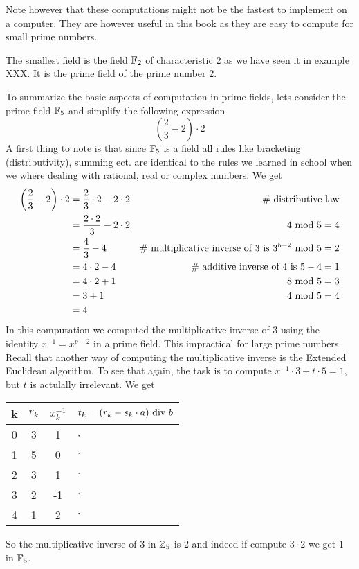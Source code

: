 Note however that these computations might not be the fastest to implement on a computer. They are however useful in this book as they are easy to compute for small prime numbers.
\begin{example}
The smallest field is the field $\mathbb{F}_2$ of characteristic $2$ as we have seen it in example XXX. It is the prime field of the prime number $2$.
\end{example}
\begin{example}
To summarize the basic aspects of computation in prime fields, lets consider the prime field $\mathbb{F}_5$ and simplify the following expression 
$$\left(\frac{2}{3} - 2\right)\cdot 2 $$
A first thing to note is that since $\mathbb{F}_5$ is a field all rules like bracketing (distributivity), summing ect. are identical to the rules we learned in school when we where dealing with rational, real or complex numbers. We get
\begin{align*}
\left(\frac{2}{3} - 2\right)\cdot 2 &= 
 \frac{2}{3}\cdot 2 - 2\cdot 2 & \text{\# distributive law}\\
 &= \frac{2\cdot 2}{3} - 2\cdot 2 & 4 \text{ mod } 5=4 \\
 &= \frac{4}{3} - 4 & \text{\# multiplicative inverse of 3 is } 3^{5-2} \text{ mod } 5=2\\
 &= 4\cdot 2 - 4 & \text{\# additive inverse of 4 is } 5-4=1\\
 &= 4\cdot 2 +1 & 8 \text{ mod } 5=3\\
 &= 3 +1 & 4 \text{ mod } 5=4\\
 &= 4
\end{align*}
In this computation we computed the multiplicative inverse of $3$ using the identity
$x^{-1}=x^{p-2}$ in a prime field. This impractical for large prime numbers. Recall that another way of computing the multiplicative inverse is the Extended Euclidean algorithm.  To see that again, the task is to compute $x^{-1}\cdot 3 + t \cdot 5 =1$, but $t$ is actulally irrelevant. We get
\begin{center}
  \begin{tabular}{c | c c l}
    k & $ r_k $ & $ x^{-1}_k $ & $ t_k = (r_k-s_k \cdot a) \text{ div } b $ \\\hline
    0 & 3 & 1 & $\cdot$\ \\
    1 & 5 & 0 & $\cdot$ \\
    2 & 3 & 1 & $\cdot$ \\
    3 & 2 &-1 & $\cdot$ \\
    4 & 1 & 2  & $\cdot$ \\
  \end{tabular}
\end{center}
So the multiplicative inverse of $3$ in $\mathbb{Z}_5$ is $2$ and indeed if compute $3\cdot 2$ we get $1$ in $\mathbb{F}_5$. 
\end{example}
